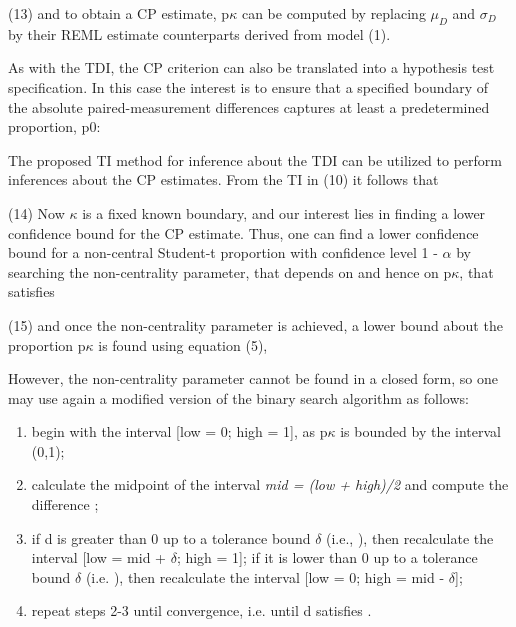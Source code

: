 \documentclass[12pt, a4paper]{report}
\theoremstyle{plain}
\theoremstyle{definition}
\theoremstyle{remark}
\begin{document}
	(13)
	and to obtain a CP estimate, p$\kappa$ can be computed by replacing $\mu_D$ and $\sigma_D$ by their REML estimate counterparts derived from model (1).
	
	As with the TDI, the CP criterion can also be translated into a hypothesis test specification. 
	In this case the interest is to ensure that a specified boundary of the absolute paired-measurement differences captures at least a predetermined proportion, p0:
	
	
	The proposed TI method for inference about the TDI can be utilized to perform inferences about the CP estimates. From the TI in (10) it follows that
	
	(14)
	Now $\kappa$ is a fixed known boundary, and our interest lies in finding a lower confidence bound for the CP estimate. 
	Thus, one can find a lower confidence bound for a non-central Student-t proportion with confidence level 1 - $\alpha$ by searching the non-centrality parameter, 
	that depends on  and hence on p$\kappa$, that satisfies
	
	(15)
	and once the non-centrality parameter  is achieved, a lower bound about the proportion p$\kappa$ is found using equation (5), 
	
	
	However, the non-centrality parameter cannot be found in a closed form, so one may use again a modified version of the binary search algorithm as follows:
	
	\begin{enumerate}
		\item begin with the interval [low = 0; high = 1], as p$\kappa$ is bounded by the interval (0,1);
		
		\item calculate the midpoint of the interval \textit{mid = (low + high)/2} and compute the difference ;
		
		\item if d is greater than 0 up to a tolerance bound $\delta$ (i.e., ), then recalculate the interval [low = mid + $\delta$; high = 1]; if it is 
		lower than 0 up to a tolerance bound $\delta$ (i.e. ), then recalculate the interval [low = 0; high = mid - $\delta$];
		
		\item repeat steps 2-3 until convergence, i.e. until d satisfies .
	\end{enumerate}
	
		
\end{document}
